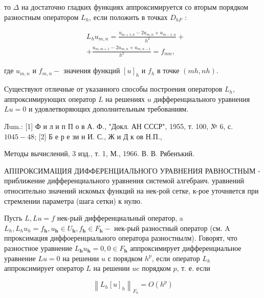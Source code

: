 \documentclass[10pt]{article}
\begin{document}
то $\Delta$ на достаточно гладких функциях аппроксимируется со вторым порядком разностным оператором $L_{h}$, если положить в точках $D_{h F}$ :



\[

\begin{aligned}

& L_{h} u_{m, n}=\frac{u_{m+1, n}-2 u_{m, n}+u_{m-1, n}}{h^{2}}+ \\

& +\frac{u_{m, m+1}-2 u_{m, n}+u_{m, n-1}}{h^{2}}=f_{m n},

\end{aligned}

\]



где $u_{m, n}$ и $f_{m, n}-$ значения функций $[u]_{h}$ и $f_{h}$ в точке $(m h, n h)$.



Существуют отличные от указанного способы построения операторов $L_{h}$, аппроксимирующих оператор $L$ на решениях $u$ дифференциального уравнения $L u=0$ и удовлетворяющих дополнительным требованиям.



Лum.: [1] Ф и л и п П о в А. Ф., "Докл. АН СССР", 1955, т. 100, № 6, с. $1045-48$; [2] Б е р е зи н И. С., Ж и Д к ов Н.П.,

Методы вычислений, 3 изд., т. 1, М., 1966. В. В. Рябенъкий.



АПIІРОКСИМАЩИЯ ДИФФЕРЕНЦИАЛЬНОГО УРАВНЕНИЯ РАВНОСТНЫМ - приближение дифференциального уравнения системой алгебраич. уравнений относительно значений искомых функций на нек-рой сетке, к-рое уточняется при стремлении параметра (шага сетки) к нулю.



Пусгь $L, L u=f$ нек-рый дифференциальный оператор, a $L_{h}, L_{h} u_{h}=f_{\boldsymbol{h}}, u_{\boldsymbol{h}} \in U_{\boldsymbol{h}}, f_{\boldsymbol{h}} \in F_{\boldsymbol{h}}-$ нек-рый разностный оператор (см. A ппроксимация диффоеренциального оператора разностнылм). Говорят, что разностное уравнение $L_{\boldsymbol{h}} u_{\boldsymbol{h}}=0,0 \in F_{\boldsymbol{h}}$ аппроксимирует дифференциальное уравнение $L u=0$ на решении $u$ с порядком $h^{p}$, если оператор $L_{h}$ аппроксимирует оператор $L$ на решении $u \mathrm{c}$ порядком $p$, т. е. если



\[

\left\|L_{h}[u]_{h}\right\|_{F_{h}}=O\left(h^{p}\right)

\]
\end{document}
